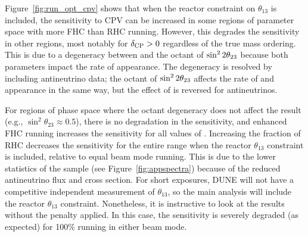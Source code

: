 Figure~\ref{fig:run_opt_cpv} shows that when the reactor constraint on $\theta_{13}$ is included, the sensitivity to CPV can be increased in some regions of \deltacp parameter space with more FHC than RHC running. However, this degrades the sensitivity in other regions, most notably for $\delta_{\rm CP} > 0$ regardless of the true mass ordering. This is due to a degeneracy between \deltacp and the octant of $\sin^22\theta_{23}$ because both parameters impact the rate of \nue appearance. The degeneracy is resolved by including antineutrino data; the octant of $\sin^22\theta_{23}$ affects the rate of \nue and \anue appearance in the same way, but the effect of \deltacp is reversed for antineutrinos.

For regions of phase space where the octant degeneracy does not affect the result (e.g., $\sin^{2}\theta_{23} \approx 0.5$), there is no degradation in the sensitivity, and enhanced FHC running increases the sensitivity for all values of \deltacp. Increasing the fraction of RHC decreases the sensitivity for the entire \deltacp range when the reactor $\theta_{13}$ constraint is included, relative to equal beam mode running. This is due to the lower statistics of the \anue sample (see Figure~\ref{fig:appspectra}) because of the reduced antineutrino flux and cross section. For short exposures, DUNE will not have a competitive independent measurement of $\theta_{13}$, so the main analysis will include the reactor $\theta_{13}$ constraint. Nonetheless, it is instructive to look at the results without the penalty applied. In this case, the sensitivity is severely degraded (as expected) for 100\% running in either beam mode.


